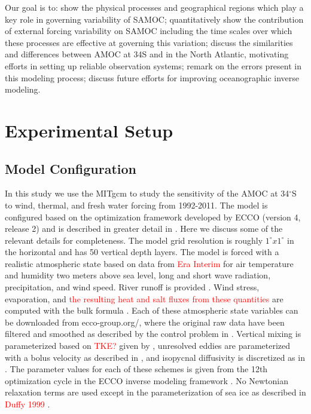 \documentclass[a4paper,11pt]{article}
\newcommand{\red}[1]{\textcolor{red}{#1}}
\begin{document}

	Our goal is to: show the physical processes and geographical regions which play a key role in governing variability of SAMOC; quantitatively show the contribution of external forcing variability on SAMOC including the time scales over which these processes are effective at governing this variation; discuss the similarities and differences between AMOC at 34S and in the North Atlantic, motivating efforts in setting up reliable observation systems; remark on the errors present in this modeling process; discuss future efforts for improving oceanographic inverse modeling.

\section{Experimental Setup}
\label{theModel}
  \subsection{Model Configuration}

	In this study we use the MITgcm to study the sensitivity of the AMOC at 34$^{\circ}$S to wind, thermal, and fresh water forcing from 1992-2011. The model is configured based on the optimization framework developed by ECCO (version 4, release 2) and is described in greater detail in \cite{forgetECCOv4}. Here we discuss some of the relevant details for completeness. The model grid resolution is roughly $1^{\circ} x 1^{\circ}$ in the horizontal and has 50 vertical depth layers. The model is forced with a realistic atmospheric state based on data from \red{Era Interim} for air temperature and humidity two meters above sea level, long and short wave radiation, precipitation, and wind speed. River runoff is provided \cite{by I don't know}. Wind stress, evaporation, and \red{the resulting heat and salt fluxes from these quantities} are computed with the bulk formula \cite{large2004}. Each of these atmospheric state variables can be downloaded from ecco-group.org/, where the original raw data have been filtered and smoothed as described by the control problem in \cite{forgetECCOv4}. Vertical mixing is parameterized based on \red{TKE?} given by \cite{ggl90}, unresolved eddies are parameterized with a bolus velocity as described in \cite{GM}, and isopycnal diffusivity is discretized as in \cite{redi1982}. The parameter values for each of these schemes is given from the 12th optimization cycle in the ECCO inverse modeling framework \cite{forgetECCOv4} \cite{forgetTurbulent}. No Newtonian relaxation terms are used except in the parameterization of sea ice as described in \red{Duffy 1999} \cite{nguyenSubgrid}. 
\end{document}
